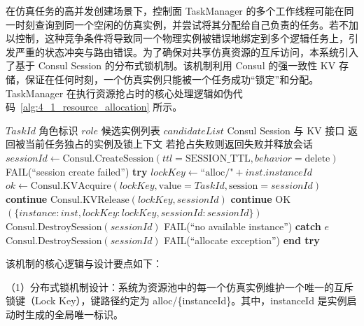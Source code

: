 \documentclass[lang=chs, degree=master, blindreview=true, winfonts=true, academic=false]{yanputhesis}
\begin{document}
在仿真任务的高并发创建场景下，控制面 TaskManager 的多个工作线程可能在同一时刻查询到同一个空闲的仿真实例，并尝试将其分配给自己负责的任务。若不加以控制，这种竞争条件将导致同一个物理实例被错误地绑定到多个逻辑任务上，引发严重的状态冲突与路由错误。为了确保对共享仿真资源的互斥访问，本系统引入了基于 Consul Session 的分布式锁机制。该机制利用 Consul 的强一致性 KV 存储，保证在任何时刻，一个仿真实例只能被一个任务成功“锁定”和分配。TaskManager 在执行资源抢占时的核心处理逻辑如伪代码~\ref{alg:4_1_resource_allocation} 所示。
\begin{algorithm}[htb]
  \caption{TaskManager 资源抢占逻辑关键代码}
  \label{alg:4_1_resource_allocation}
  \begin{algorithmic}[1]
    \Require $TaskId$ 角色标识 $role$ 候选实例列表 $candidateList$ Consul Session 与 KV 接口
    \Ensure 返回被当前任务独占的实例及锁上下文 若抢占失败则返回失败并释放会话
    \Statex
      \State $sessionId \gets \text{Consul.CreateSession}(ttl = \text{SESSION\_TTL}, behavior = \text{delete})$
        \State \Return FAIL(``session create failed'')
      \EndIf
      \Statex
      \State \textbf{try}
        \State $lockKey \gets \text{``alloc/"} + inst.instanceId$
        \State $ok \gets \text{Consul.KVAcquire}(lockKey, \text{value} = TaskId, \text{session} = sessionId)$
          \State \textbf{continue} 
        \EndIf
        \Statex
         
          \State $\text{Consul.KVRelease}(lockKey, sessionId)$
          \State \textbf{continue}
        \EndIf
        \Statex
        \State \Return OK$(\{instance: inst, lockKey: lockKey, sessionId: sessionId\})$
      \EndFor
      \Statex
      \State $\text{Consul.DestroySession}(sessionId)$ 
      \State \Return FAIL(``no available instance'')
      \Statex
      \State \textbf{catch} $e$
      \State $\text{Consul.DestroySession}(sessionId)$ 
      \State \Return FAIL(``allocate exception'')
      \State \textbf{end try}
    \EndFunction
  \end{algorithmic}
\end{algorithm}
该机制的核心逻辑与设计要点如下：

（1）分布式锁机制设计：系统为资源池中的每一个仿真实例维护一个唯一的互斥锁键（Lock Key），键路径约定为 alloc/\{instanceId\}。其中，instanceId 是实例启动时生成的全局唯一标识。
\end{document}
